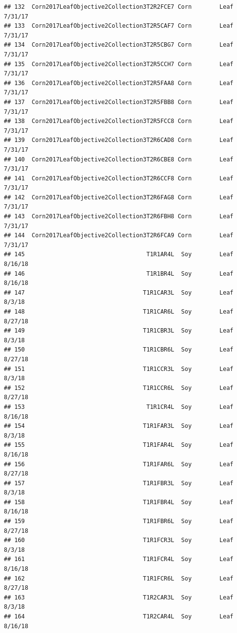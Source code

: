 \documentclass[
]{article}
\begin{document}
\begin{verbatim}
## 132  Corn2017LeafObjective2Collection3T2R2FCE7 Corn        Leaf     7/31/17
## 133  Corn2017LeafObjective2Collection3T2R5CAF7 Corn        Leaf     7/31/17
## 134  Corn2017LeafObjective2Collection3T2R5CBG7 Corn        Leaf     7/31/17
## 135  Corn2017LeafObjective2Collection3T2R5CCH7 Corn        Leaf     7/31/17
## 136  Corn2017LeafObjective2Collection3T2R5FAA8 Corn        Leaf     7/31/17
## 137  Corn2017LeafObjective2Collection3T2R5FBB8 Corn        Leaf     7/31/17
## 138  Corn2017LeafObjective2Collection3T2R5FCC8 Corn        Leaf     7/31/17
## 139  Corn2017LeafObjective2Collection3T2R6CAD8 Corn        Leaf     7/31/17
## 140  Corn2017LeafObjective2Collection3T2R6CBE8 Corn        Leaf     7/31/17
## 141  Corn2017LeafObjective2Collection3T2R6CCF8 Corn        Leaf     7/31/17
## 142  Corn2017LeafObjective2Collection3T2R6FAG8 Corn        Leaf     7/31/17
## 143  Corn2017LeafObjective2Collection3T2R6FBH8 Corn        Leaf     7/31/17
## 144  Corn2017LeafObjective2Collection3T2R6FCA9 Corn        Leaf     7/31/17
## 145                                   T1R1AR4L  Soy        Leaf     8/16/18
## 146                                   T1R1BR4L  Soy        Leaf     8/16/18
## 147                                  T1R1CAR3L  Soy        Leaf      8/3/18
## 148                                  T1R1CAR6L  Soy        Leaf     8/27/18
## 149                                  T1R1CBR3L  Soy        Leaf      8/3/18
## 150                                  T1R1CBR6L  Soy        Leaf     8/27/18
## 151                                  T1R1CCR3L  Soy        Leaf      8/3/18
## 152                                  T1R1CCR6L  Soy        Leaf     8/27/18
## 153                                   T1R1CR4L  Soy        Leaf     8/16/18
## 154                                  T1R1FAR3L  Soy        Leaf      8/3/18
## 155                                  T1R1FAR4L  Soy        Leaf     8/16/18
## 156                                  T1R1FAR6L  Soy        Leaf     8/27/18
## 157                                  T1R1FBR3L  Soy        Leaf      8/3/18
## 158                                  T1R1FBR4L  Soy        Leaf     8/16/18
## 159                                  T1R1FBR6L  Soy        Leaf     8/27/18
## 160                                  T1R1FCR3L  Soy        Leaf      8/3/18
## 161                                  T1R1FCR4L  Soy        Leaf     8/16/18
## 162                                  T1R1FCR6L  Soy        Leaf     8/27/18
## 163                                  T1R2CAR3L  Soy        Leaf      8/3/18
## 164                                  T1R2CAR4L  Soy        Leaf     8/16/18

\end{verbatim}
\end{document}

